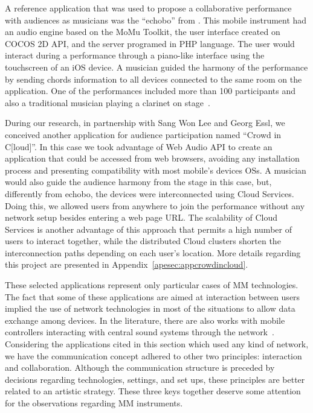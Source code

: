 A reference application that was used to propose a collaborative performance with audiences as musicians was the ``echobo'' from \citeauthor{Lee2013echobo}.
This mobile instrument had an audio engine based on the MoMu Toolkit, the user interface created on COCOS 2D API, and the server programed in PHP language. 
The user would interact during a performance through a piano-like interface using the touchscreen of an iOS device.
A musician guided the harmony of the performance by sending chords information to all devices connected to the same room on the application.
One of the performances included more than 100 participants and also a traditional musician playing a clarinet on stage~\citep{Lee2013echobo}.

During our research, in partnership with Sang Won Lee and Georg Essl, we conceived another application for audience participation named ``Crowd in C[loud]''.
In this case we took advantage of Web Audio API to create an application that could be accessed from web browsers, avoiding any installation process and presenting compatibility with most mobile's devices OSs.
A musician would also guide the audience harmony from the stage in this case, but, differently from echobo, the devices were interconnected using Cloud Services.
Doing this, we allowed users from anywhere to join the performance without any network setup besides entering a web page URL.
The scalability of Cloud Services is another advantage of this approach that permits a high number of users to interact together, while the distributed Cloud clusters shorten the interconnection paths depending on each user's location.
More details regarding this project are presented in Appendix~\ref{apesec:appcrowdincloud}.

These selected applications represent only particular cases of MM technologies.
The fact that some of these applications are aimed at interaction between users implied the use of network technologies in most of the situations to allow data exchange among devices.
In the literature, there are also works with mobile controllers interacting with central sound systems through the network~\citep{Weitzner2012massmobile,Allison2013nexus,Hindle2013swarmed}.
Considering the applications cited in this section which used any kind of network, we have the communication concept adhered to other two principles: interaction and collaboration.
Although the communication structure is preceded by decisions regarding technologies, settings, and set ups, these principles are better related to an artistic strategy.
These three keys together deserve some attention for the observations regarding MM instruments.






